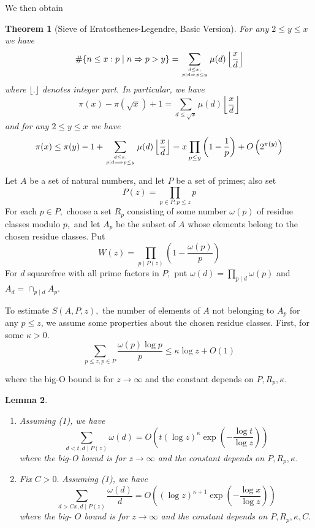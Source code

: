 \documentclass[11pt]{article}
\newtheorem{theorem}{Theorem}[section]
\newtheorem{lemma}[theorem]{Lemma}
\theoremstyle{definition}
\begin{document}
We then obtain

\begin{theorem}[Sieve of Eratosthenes-Legendre, Basic Version] For any $2 \leq y \leq x$ we have
$$
\#\{n \leq x: p \mid n \Rightarrow p>y\}=\sum_{d \leq x, \atop p \mid d \Rightarrow p \leq y} \mu(d)\left\lfloor\frac{x}{d}\right\rfloor
$$
where $\lfloor.\rfloor$ denotes integer part.
In particular, we have
$$
\pi(x)-\pi(\sqrt{x})+1=\sum_{d \leq \sqrt{x}} \mu(d)\left\lfloor\frac{x}{d}\right\rfloor
$$
and for any $2 \leq y \leq x$ we have
$$
\pi(x) \leq \pi(y)-1+\sum_{d \leq x, \atop p \mid d \Longrightarrow p \leq y} \mu(d)\left\lfloor\frac{x}{d}\right\rfloor=x \prod_{p \leq y}\left(1-\frac{1}{p}\right)+O\left(2^{\pi(y)}\right)
$$
\end{theorem}

Let $A$ be a set of natural numbers, and let $P$ be a set of primes; also set
$$
P(z)=\prod_{p \in P, p \leq z} p
$$
For each $p \in P,$ choose a set $R_{p}$ consisting of some number $\omega(p)$ of residue classes modulo $p,$ and let $A_{p}$ be the subset of $A$ whose elements belong to the chosen residue classes. Put
$$
W(z)=\prod_{p \mid P(z)}\left(1-\frac{\omega(p)}{p}\right)
$$
For $d$ squarefree with all prime factors in $P,$ put $\omega(d)=\prod_{p \mid d} \omega(p)$ and $A_{d}=\cap_{p \mid d} A_{p}$.

To estimate $S(A, P, z),$ the number of elements of $A$ not belonging to $A_{p}$ for any $p \leq z$, we assume some properties about the chosen residue classes. First, for some $\kappa>0$.
\begin{equation}
\sum_{p \leq z, p \in P} \frac{\omega(p) \log p}{p} \leq \kappa \log z+O(1)    
\end{equation}

where the big-O bound is for $z \rightarrow \infty$ and the constant depends on $P, R_{p}, \kappa$.

\begin{lemma}
\begin{enumerate}
    \item Assuming (1), we have
$$
\sum_{d<t, d \mid P(z)} \omega(d)=O\left(t(\log z)^{\kappa} \exp \left(-\frac{\log t}{\log z}\right)\right)
$$
where the big-O bound is for $z \rightarrow \infty$ and the constant depends on $P, R_{p}, \kappa$.
    \item Fix $C>0 .$ Assuming (1), we have
$$
\sum_{d>C x, d \mid P(z)} \frac{\omega(d)}{d}=O\left((\log z)^{\kappa+1} \exp \left(-\frac{\log x}{\log z}\right)\right)
$$
where the big- $O$ bound is for $z \rightarrow \infty$ and the constant depends on $P, R_{p}, \kappa, C .$
\end{enumerate}
 
\end{lemma}
\end{document}

